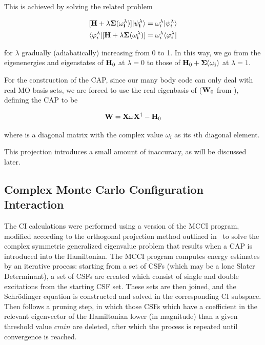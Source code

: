 This is achieved by solving the related problem

\begin{subequations}
\begin{align}
	[\mathbf{H} + \lambda \mathbf{\Sigma(\omega_i^\lambda)] |\psi_i^\lambda \rangle}
	&= \omega_i^\lambda |\psi_i^\lambda \rangle \\
	\langle \varphi_i^\lambda| [\mathbf{H} + \lambda \mathbf{\Sigma(\omega_i^\lambda)}]
	&= \omega_i^\lambda \langle \varphi_i^\lambda| 
	\label{eq:adiabaticap}
\end{align}
\end{subequations}

for $\lambda$ gradually (adiabatically) increasing from 0 to 1. In this way, we
go from the eigenenergies and eigenstates of $\mathbf{H}_0$ at $\lambda = 0$ to
those of $\mathbf{H}_0 + \mathbf{\Sigma(\omega_i)}$ at $\lambda = 1$.

For the construction of the \ac{CAP}, since our many body code can only deal
with real MO basis sets, we are forced to use the real eigenbasis of 
($\mathbf{W}_0$ from \cite{henderson}), defining the \ac{CAP} to be

\begin{equation}
	\mathbf{W} = \mathbf{X}\mathbf{\omega}\mathbf{X}^\dagger - \mathbf{H}_0
	\label{eq:capsdef}
\end{equation}

where \umm{\omega} is a diagonal matrix with the complex value $\omega_i$ as
its $i$th diagonal element.

This projection introduces a small amount of inaccuracy, as will be discussed
later.

\subsection{Complex Monte Carlo Configuration Interaction}

The \ac{CI} calculations were performed using a version of the \ac{MCCI}
program, modified according to the orthogonal projection method outlined
in~\cite{tarantelli_csd} to solve the complex symmetric generalized eigenvalue
problem that results when a \ac{CAP} is introduced into the Hamiltonian. The
\ac{MCCI} program computes energy estimates by an iterative process: starting
from a set of \acp{CSF} (which may be a lone Slater Determinant), a set of
\acp{CSF} are created which consist of single and double excitations from the
starting \ac{CSF} set. These sets are then joined, and the Schr\"odinger
equation is constructed and solved in the corresponding \ac{CI} subspace. Then
follows a pruning step, in which those \acp{CSF} which have a coefficient in
the relevant eigenvector of the Hamiltonian lower (in magnitude) than a given
threshold value $cmin$ are deleted, after which the process is repeated until
convergence is reached.

